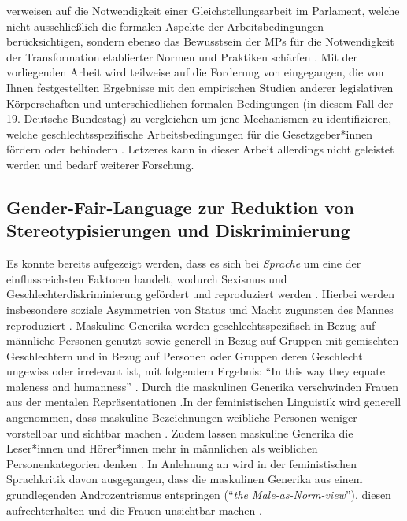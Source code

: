\documentclass[12pt, 
    twoside=false, 
    bibliography=totoc, 
    numbers=endperiod, 
    headings=normal, 
    toc=chapterentrydotfill
    ]{scrbook}
\begin{document}
\citeauthor{erikson_2018} verweisen auf die Notwendigkeit einer Gleichstellungsarbeit im Parlament, welche nicht ausschließlich die formalen Aspekte der Arbeitsbedingungen berücksichtigen, sondern ebenso das Bewusstsein der MPs für die Notwendigkeit der Transformation etablierter Normen und Praktiken schärfen \parencite[211]{erikson_2018}.
Mit der vorliegenden Arbeit wird teilweise auf die Forderung von\citeauthor{erikson_2018} eingegangen, die von Ihnen festgestellten Ergebnisse mit den empirischen Studien anderer legislativen Körperschaften und unterschiedlichen formalen Bedingungen (in diesem Fall der 19. Deutsche Bundestag) zu vergleichen um jene Mechanismen zu identifizieren, welche geschlechtsspezifische Arbeitsbedingungen für die Gesetzgeber*innen fördern oder behindern \parencite[211]{erikson_2018}. Letzeres kann in dieser Arbeit allerdings nicht geleistet werden und bedarf weiterer Forschung. 

\subsection{Gender-Fair-Language zur Reduktion von Stereotypisierungen und Diskriminierung}\label{kapitel:gfl-studien}

Es konnte bereits aufgezeigt werden, dass es sich bei \emph{Sprache} um eine der einflussreichsten Faktoren handelt, wodurch Sexismus und Geschlechterdiskriminierung gefördert und reproduziert werden \parencite*[1]{menegatti_2017}. Hierbei werden insbesondere soziale Asymmetrien von Status und Macht zugunsten des Mannes reproduziert \parencite{menegatti_2017}.
Maskuline Generika werden geschlechtsspezifisch in Bezug auf männliche Personen genutzt sowie generell in Bezug auf Gruppen mit gemischten Geschlechtern und in Bezug auf Personen oder Gruppen deren Geschlecht ungewiss oder irrelevant ist, mit folgendem Ergebnis: \enquote{In this way they equate maleness and humanness} \parencite[169]{stahlberg_2007}. Durch die maskulinen Generika verschwinden Frauen aus der mentalen Repräsentationen \parencites{vaughan_2018}{stahlberg_2001}.In der feministischen Linguistik wird generell angenommen, dass maskuline Bezeichnungen weibliche Personen weniger vorstellbar und sichtbar machen \parencite[131]{stahlberg_2001}. Zudem lassen maskuline Generika die Leser*innen und Hörer*innen mehr in männlichen als weiblichen Personenkategorien denken \parencites[2]{sczesny_2016}{stahlberg_2007}. In Anlehnung an \textcite{stahlberg_2007} wird in der feministischen Sprachkritik davon ausgegangen, dass die maskulinen Generika aus einem grundlegenden Androzentrismus entspringen (\enquote{\emph{the Male-as-Norm-view}}), diesen aufrechterhalten und die Frauen unsichtbar machen \parencites[170]{stahlberg_2007}{miller_1976}{silveira_1980}.
\end{document}
